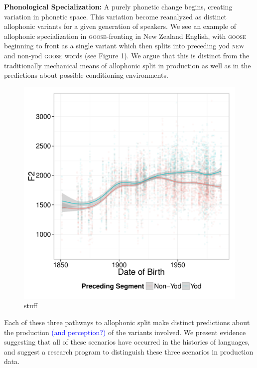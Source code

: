 \documentclass[a4paper,aps,prl,12pt,tightenlines,superscriptaddress]{revtex4}
\begin{document}
\textbf{Phonological Specialization:} %
A purely phonetic change begins, creating variation in phonetic space. This variation become reanalyzed as distinct allophonic variants for a given generation of speakers. We see an example of allophonic specialization in \textsc{goose}-fronting in New Zealand English, with \textsc{goose} beginning to front as a single variant which then splits into preceding yod \textsc{new} and non-yod \textsc{goose} words (see Figure 1). We argue that this is distinct from the traditionally mechanical means of allophonic split in production as well as in the predictions about possible conditioning environments.

\begin{figure}
\begin{center}
\includegraphics[width=.5\textwidth]{ByTokenOldPreceding.pdf}
\end{center}
\caption{stuff}
\label{newzeaFig}
\end{figure}


\noindent Each of these three pathways to allophonic split make distinct predictions about the production \textcolor{blue}{(and perception?)} of the variants involved. We present evidence suggesting that all of these scenarios have occurred in the histories of languages, and suggest a research program to distinguish these three scenarios in production data. 


 

\end{document}
